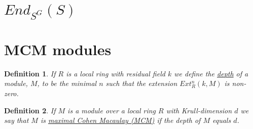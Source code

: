 \documentclass[11pt, a4paper, english]{article}
\newtheorem*{defin}{Definition}
\begin{document}
\section*{$End_{S^G}(S)$}

\section{MCM modules}
\begin{defin}
If $R$ is a local ring with residual field $k$ we define the \underline{depth} of a module, $M$, to be the minimal $n$ such that the extension $Ext^n_R(k, M)$ is non-zero.
\end{defin}

\begin{defin}
If $M$ is a module over a local ring $R$ with Krull-dimension $d$ we say that $M$ is \underline{maximal Cohen Macaulay (MCM)} if the depth of $M$ equals $d$.
\end{defin}
\end{document}
